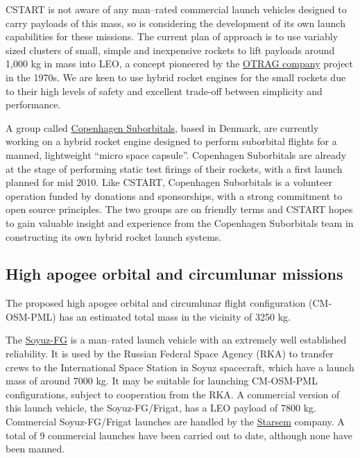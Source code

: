 \documentclass{report}
\begin{document}
CSTART is not aware of any man--rated commercial launch vehicles designed to carry payloads of this mass, so is considering the development of its own launch capabilities for these missions.  The current plan of approach is to use variably sized clusters of small, simple and inexpensive rockets to lift payloads around 1,000 kg in mass into LEO, a concept pioneered by the \href{http://en.wikipedia.org/wiki/OTRAG}{OTRAG company} project in the 1970s.  We are keen to use hybrid rocket engines for the small rockets due to their high levels of safety and excellent trade-off between simplicity and performance.

A group called \href{http://www.copenhagensuborbitals.com/}{Copenhagen Suborbitals}, based in Denmark, are currently working on a hybrid rocket engine designed to perform suborbital flights for a manned, lightweight ``micro space capsule''.  Copenhagen Suborbitals are already at the stage of performing static test firings of their rockets, with a first launch planned for mid 2010.  Like CSTART, Copenhagen Suborbitals is a volunteer operation funded by donations and sponsorships, with a strong commitment to open source principles.  The two groups are on friendly terms and CSTART hopes to gain valuable insight and experience from the Copenhagen Suborbitals team in constructing its own hybrid rocket launch systems.

\subsection{High apogee orbital and circumlunar missions}

The proposed high apogee orbital and circumlunar flight configuration (CM-OSM-PML) has an estimated total mass in the vicinity of 3250 kg.

The \href{http://en.wikipedia.org/wiki/Soyuz-FG}{Soyuz-FG} is a man--rated launch vehicle with an extremely well established reliability.  It is used by the Russian Federal Space Agency (RKA) to transfer crews to the International Space Station in Soyuz spacecraft, which have a launch mass of around 7000 kg.  It may be suitable for launching CM-OSM-PML configurations, subject to cooperation from the RKA.  A commercial version of this launch vehicle, the Soyuz-FG/Frigat, has a LEO payload of 7800 kg.  Commercial Soyuz-FG/Frigat launches are handled by the \href{http://www.starsem.com}{Starsem} company.  A total of 9 commercial launches have been carried out to date, although none have been manned.
\end{document}

